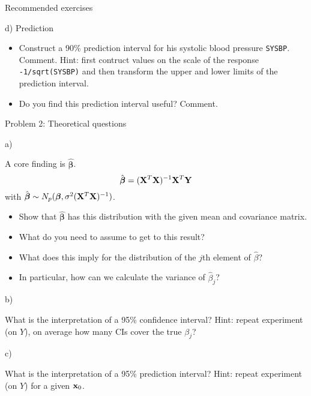 \documentclass[ignorenonframetext,]{beamer}
\providecommand{\tightlist}{%
  \setlength{\itemsep}{0pt}\setlength{\parskip}{0pt}}
\begin{document}
\begin{frame}[fragile]{Recommended exercises}
\begin{block}{d) Prediction}
\begin{itemize}
\tightlist
\item
  Construct a 90\% prediction interval for his systolic blood pressure
  \texttt{SYSBP}. Comment. Hint: first contruct values on the scale of
  the response \texttt{-1/sqrt(SYSBP)} and then transform the upper and
  lower limits of the prediction interval.
\item
  Do you find this prediction interval useful? Comment.
\end{itemize}

\end{block}

\end{frame}

\begin{frame}

\begin{block}{Problem 2: Theoretical questions}

\begin{block}{a)}

A core finding is \(\hat{\boldsymbol\beta}\).
\[ \hat{\boldsymbol\beta}=({\bf X}^T{\bf X})^{-1} {\bf X}^T {\bf Y}\]
with
\(\hat{\boldsymbol\beta}\sim N_{p}(\boldsymbol\beta,\sigma^2({\bf X}^T{\bf X})^{-1})\).

\begin{itemize}
\tightlist
\item
  Show that \(\hat{\boldsymbol\beta}\) has this distribution with the
  given mean and covariance matrix.
\item
  What do you need to assume to get to this result?
\item
  What does this imply for the distribution of the \(j\)th element of
  \(\hat{\beta}\)?
\item
  In particular, how can we calculate the variance of \(\hat{\beta}_j\)?
\end{itemize}

\end{block}

\begin{block}{b)}

What is the interpretation of a 95\% confidence interval? Hint: repeat
experiment (on \(Y\)), on average how many CIs cover the true
\(\beta_j\)?

\end{block}

\begin{block}{c)}

What is the interpretation of a 95\% prediction interval? Hint: repeat
experiment (on \(Y\)) for a given \({\bf x}_0\).


\end{block}
\end{block}
\end{frame}
\end{document}
